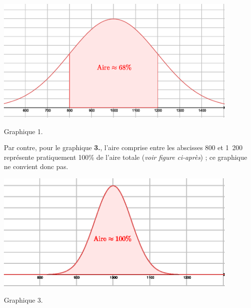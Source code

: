 \begin{corrige}
\begin{enumerate}
          \begin{center}
               \begin{extern}%
                    \includegraphics[width=0.9\textwidth]{images/BBESL-s5-1-5}%
               \end{extern}
          \end{center}
          \begin{center}
               Graphique 1.
          \end{center}
          \par
          Par contre, pour le graphique \textbf{3.}, l'aire comprise entre les abscisses 800 et 1\ 200 représente pratiquement 100\% de l'aire totale (\textit{voir figure ci-après}) ; ce graphique ne convient donc pas.
          \begin{center}
               \begin{extern}%
                    \includegraphics[width=0.9\textwidth]{images/BBESL-s5-1-6}%
               \end{extern}
          \end{center}
          \begin{center}
               Graphique 3.
          \end{center}

\end{enumerate}
\end{corrige}
